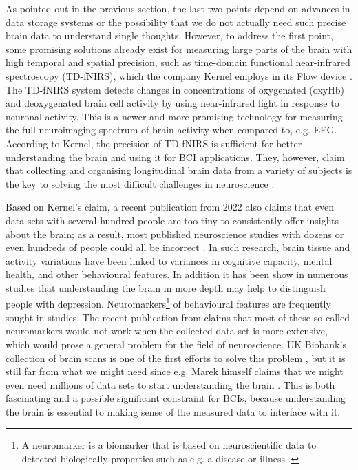 As pointed out in the previous section, the last two points depend on advances in data storage systems or the possibility that we do not actually need such precise brain data to understand single thoughts. However, to address the first point, some promising solutions already exist for measuring large parts of the brain with high temporal and spatial precision, such as time-domain functional near-infrared spectroscopy (TD-fNIRS), which the company Kernel employs in its Flow device \citep{ban_kernel_2021}. The TD-fNIRS system detects changes in concentrations of oxygenated (oxyHb) and deoxygenated brain cell activity by using near-infrared light in response to neuronal activity. This is a newer and more promising technology for measuring the full neuroimaging spectrum of brain activity when compared to, e.g. EEG. According to Kernel, the precision of TD-fNIRS is sufficient for better understanding the brain and using it for BCI applications. They, however, claim that collecting and organising longitudinal brain data from a variety of subjects is the key to solving the most difficult challenges in neuroscience \citep{kernel_hello-humanitypdf_nodate}.

\newpage

Based on Kernel's claim, a recent publication from 2022 also claims that even data sets with several hundred people are too tiny to consistently offer insights about the brain; as a result, most published neuroscience studies with dozens or even hundreds of people could all be incorrect \citep{marek_reproducible_2022}. In such research, brain tissue and activity variations have been linked to variances in cognitive capacity, mental health, and other behavioural features. In addition it has been show in numerous studies that understanding the brain in more depth may help to distinguish people with depression. Neuromarkers\footnote{A neuromarker is a biomarker that is based on neuroscientific data to detected biologically properties such as e.g. a disease or illness \citep{jollans_neuromarkers_2018}.} of behavioural features are frequently sought in studies. The recent publication from \citeauthor{marek_reproducible_2022} claims that most of these so-called neuromarkers would not work when the collected data set is more extensive, which would prose a general problem for the field of neuroscience. UK Biobank's collection of brain scans is one of the first efforts to solve this problem \citep{noauthor_imaging_nodate}, but it is still far from what we might need since e.g. Marek himself claims that we might even need millions of data sets to start understanding the brain \citep{callaway_can_2022}. This is both fascinating and a possible significant constraint for BCIs, because understanding the brain is essential to making sense of the measured data to interface with it.

